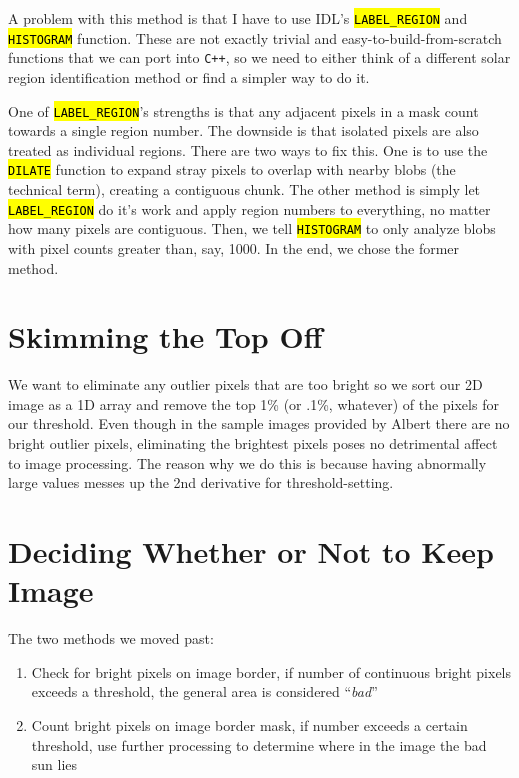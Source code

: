 \documentclass[10pt]{scrartcl}
\begin{document}
A problem with this method is that I have to use IDL's \hl{\texttt{LABEL\_REGION}} and \hl{\texttt{HISTOGRAM}} function. These are not exactly trivial and easy-to-build-from-scratch functions that we can port into \texttt{C++}, so we need to either think of a different solar region identification method or find a simpler way to do it. 

One of \hl{\texttt{LABEL\_REGION}}'s strengths is that any adjacent pixels in a mask count towards a single region number. The downside is that isolated pixels are also treated as individual regions. There are two ways to fix this. One is to use the \hl{\texttt{DILATE}} function to expand stray pixels to overlap with nearby blobs (the technical term), creating a contiguous chunk. The other method is simply let \hl{\texttt{LABEL\_REGION}} do it's work and apply region numbers to everything, no matter how many pixels are contiguous. Then, we tell \hl{\texttt{HISTOGRAM}} to only analyze blobs with pixel counts greater than, say, 1000. In the end, we chose the former method.


\section{Skimming the Top Off} %
\label{sec:skimming_the_top_off}
We want to eliminate any outlier pixels that are too bright so we sort our 2D image as a 1D array and remove the top 1\% (or .1\%, whatever) of the pixels for our threshold. Even though in the sample images provided by Albert there are no bright outlier pixels, eliminating the brightest pixels poses no detrimental affect to image processing. The reason why we do this is because having abnormally large values messes up the 2nd derivative for threshold-setting.

\section{Deciding Whether or Not to Keep Image} %
\label{sec:deciding_whether_or_not_to_keep_image}
The two methods we moved past:

\begin{enumerate}
    \item Check for bright pixels on image border, if number of continuous bright pixels exceeds a threshold, the general area is considered ``\emph{bad}''
    \item Count bright pixels on image border mask, if number exceeds a certain threshold, use further processing to determine where in the image the bad sun lies
\end{enumerate}
\end{document}
